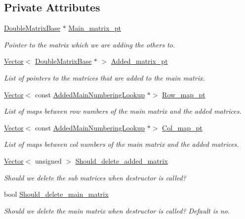 \subsection*{Private Attributes}
\begin{DoxyCompactItemize}
\item 
\hyperlink{classoomph_1_1DoubleMatrixBase}{Double\+Matrix\+Base} $\ast$ \hyperlink{classoomph_1_1SumOfMatrices_afa2c914fc55c972b1389de3d9b7a7266}{Main\+\_\+matrix\+\_\+pt}
\begin{DoxyCompactList}\small\item\em Pointer to the matrix which we are adding the others to. \end{DoxyCompactList}\item 
\hyperlink{classoomph_1_1Vector}{Vector}$<$ \hyperlink{classoomph_1_1DoubleMatrixBase}{Double\+Matrix\+Base} $\ast$ $>$ \hyperlink{classoomph_1_1SumOfMatrices_a65dfe9fb848ae855f9949f1621df4df8}{Added\+\_\+matrix\+\_\+pt}
\begin{DoxyCompactList}\small\item\em List of pointers to the matrices that are added to the main matrix. \end{DoxyCompactList}\item 
\hyperlink{classoomph_1_1Vector}{Vector}$<$ const \hyperlink{classoomph_1_1AddedMainNumberingLookup}{Added\+Main\+Numbering\+Lookup} $\ast$$>$ \hyperlink{classoomph_1_1SumOfMatrices_ada8abf72cfd7c3c74b2f656191f06a31}{Row\+\_\+map\+\_\+pt}
\begin{DoxyCompactList}\small\item\em List of maps between row numbers of the main matrix and the added matrices. \end{DoxyCompactList}\item 
\hyperlink{classoomph_1_1Vector}{Vector}$<$ const \hyperlink{classoomph_1_1AddedMainNumberingLookup}{Added\+Main\+Numbering\+Lookup} $\ast$$>$ \hyperlink{classoomph_1_1SumOfMatrices_a0c3227daf48147b18bc5360fafc53d1f}{Col\+\_\+map\+\_\+pt}
\begin{DoxyCompactList}\small\item\em List of maps between col numbers of the main matrix and the added matrices. \end{DoxyCompactList}\item 
\hyperlink{classoomph_1_1Vector}{Vector}$<$ unsigned $>$ \hyperlink{classoomph_1_1SumOfMatrices_abba55a2123febe3b1bb89ee010a56eb5}{Should\+\_\+delete\+\_\+added\+\_\+matrix}
\begin{DoxyCompactList}\small\item\em Should we delete the sub matrices when destructor is called? \end{DoxyCompactList}\item 
bool \hyperlink{classoomph_1_1SumOfMatrices_af1a5407d43ff8bbf0715d28f6d9e1642}{Should\+\_\+delete\+\_\+main\+\_\+matrix}
\begin{DoxyCompactList}\small\item\em Should we delete the main matrix when destructor is called? Default is no. \end{DoxyCompactList}\end{DoxyCompactItemize}
